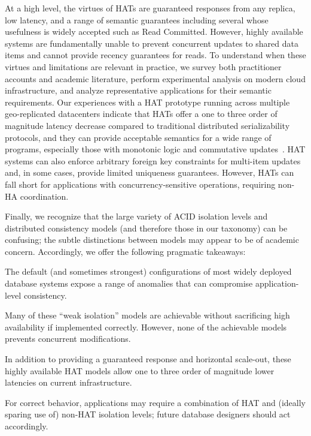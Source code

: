 At a high level, the virtues of HATs are guaranteed responses from any
replica, low latency, and a range of semantic guarantees including
several whose usefulness is widely accepted such as Read
Committed. However, highly available systems are fundamentally unable
to prevent concurrent updates to shared data items and cannot provide
recency guarantees for reads. To understand when these virtues and
limitations are relevant in practice, we survey both practitioner
accounts and academic literature, perform experimental analysis on
modern cloud infrastructure, and analyze representative applications
for their semantic requirements. Our experiences with a HAT prototype
running across multiple geo-replicated datacenters indicate that HATs
offer a one to three order of magnitude latency decrease compared to
traditional distributed serializability protocols, and they can
provide acceptable semantics for a wide range of programs, especially
those with monotonic logic and commutative updates~\cite{calm,
  crdt}. HAT systems can also enforce arbitrary foreign key
constraints for multi-item updates and, in some cases, provide limited
uniqueness guarantees. However, HATs can fall short for applications
with concurrency-sensitive operations, requiring non-HA coordination.

Finally, we recognize that the large variety of ACID isolation levels
and distributed consistency models (and therefore those in our
taxonomy) can be confusing; the subtle distinctions between models may
appear to be of academic concern. Accordingly, we offer the following
pragmatic takeaways:
\begin{introenumerate}
\item The default (and sometimes strongest) configurations of most
  widely deployed database systems expose a range of anomalies that
  can compromise application-level consistency.

\item Many of these ``weak isolation'' models are achievable without
  sacrificing high availability if implemented correctly. However,
  none of the achievable models prevents concurrent modifications.

\item In addition to providing a guaranteed response and horizontal
  scale-out, these highly available HAT models allow one to three
  order of magnitude lower latencies on current infrastructure.

\item For correct behavior, applications may require a combination of
  HAT and (ideally sparing use of) non-HAT isolation levels; future
  database designers should act accordingly.
\end{introenumerate}

